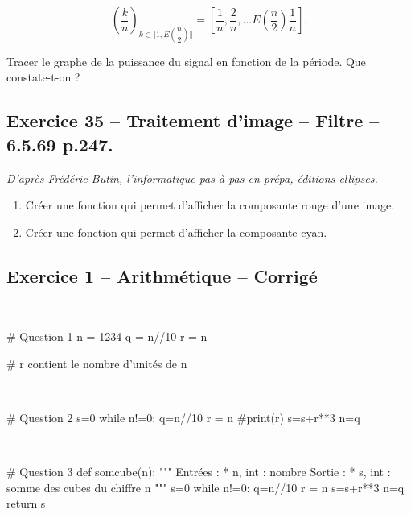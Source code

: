 \documentclass[10pt,fleqn]{article} %
\begin{document}
\begin{multicols}{2}
\begin{enumerate}
$$
\left( \dfrac{k}{n} \right)_{k\in \llbracket 1, E\left(\dfrac{n}{2}\right) \rrbracket} = \left[ \dfrac{1}{n},\dfrac{2}{n},\ldots E\left(\dfrac{n}{2}\right) \dfrac{1}{n}\right].
$$

Tracer le graphe de la puissance du signal en fonction de la période. Que constate-t-on ?
\end{enumerate}

\subsection*{Exercice 35 -- Traitement d'image -- Filtre -- 6.5.69 p.247.}
\begin{flushright}
\textit{D'après Frédéric Butin, l'informatique pas à pas en prépa, éditions ellipses.}
\end{flushright}

\begin{enumerate}
\item Créer une fonction qui permet d'afficher la composante rouge d'une image. 
\item Créer une fonction qui permet d'afficher la composante cyan.
\end{enumerate}

\newpage





\subsection*{Exercice 1 -- Arithmétique -- Corrigé}

\begin{corrige}
$\quad$
\begin{python}
# Question 1
n = 1234
q = n//10
r =  n%

# r contient le nombre d'unités de n
\end{python}
\end{corrige}

\begin{corrige}
$\quad$
\begin{python}
# Question 2
s=0
while n!=0:
    q=n//10
    r = n%
    #print(r)
    s=s+r**3
    n=q
\end{python}
\end{corrige}

\begin{corrige}
$\quad$
\begin{python}
# Question 3
def somcube(n):
    """
    Entrées :
     * n, int : nombre
    Sortie : 
     * s, int : somme des cubes du chiffre n
    """
    s=0
    while n!=0:
        q=n//10
        r = n%
        s=s+r**3
        n=q
    return s
\end{python}
\end{corrige}


\end{multicols}
\end{document}
